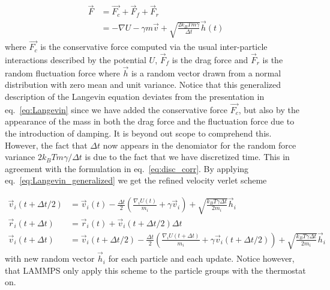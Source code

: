 \begin{align}
  \vec{F} &= \vec{F_c} + \vec{F}_{f} + \vec{F}_{r} \nonumber \\
  &= -\nabla U - \gamma m \vec{v} + \sqrt{\frac{2 k_B T m \gamma}{\Delta t}}\vec{h}(t)
  \label{eq:Langevin_generalized}
\end{align}
where $\vec{F_c}$ is the conservative force computed via the usual
inter-particle interactions described by the potential $U$, $\vec{F}_f$ is the
drag force and $\vec{F}_r$ is the random fluctuation force where $\vec{h}$ is a
random vector drawn from a normal distribution with zero mean and unit variance.
Notice that this generalized description of the Langevin equation deviates from
the presentation in eq.~\eqref{eq:Langevin} since we have added the conservative
force $\vec{F_c}$, but also by the appearance of the mass in both the drag force
and the fluctuation force due to the introduction of damping. It is beyond out
scope to comprehend this. However, the fact that $\Delta t$ now appears in the
denomiator for the random force variance $2k_B T m \gamma / \Delta t$ is due to
the fact that we have discretized time. This in agreement with the formulation
in eq.~\eqref{eq:disc_corr}. By applying eq.~\eqref{eq:Langevin_generalized} we
get the refined velocity verlet scheme


\begin{align*}
  \vec{v}_i(t + \Delta t/2)  &= \vec{v}_i(t) - \frac{\Delta t}{2}\left(\frac{\nabla_i U(t)}{m_i} + \gamma \vec{v}_i \right) + \sqrt{\frac{k_B T \gamma \Delta t}{2m_i}} \vec{h}_i \\ 
  \vec{r}_i(t + \Delta t) &= \vec{r}_i(t) + \vec{v}_i(t + \Delta t/2) \Delta t \\
  \vec{v}_i(t + \Delta t) &= \vec{v}_i(t+ \Delta t/2) - \frac{\Delta t}{2}\left(\frac{\nabla_i U(t + \Delta t)}{m_i} + \gamma \vec{v}_i(t + \Delta t/2) \right) + \sqrt{\frac{k_B T \gamma \Delta t}{2m_i}} \vec{h}_i
\end{align*}
with new random vector $\vec{h}_i$ for each particle and each update. Notice
however, that LAMMPS only apply this scheme to the particle groups with the
thermostat on. 



